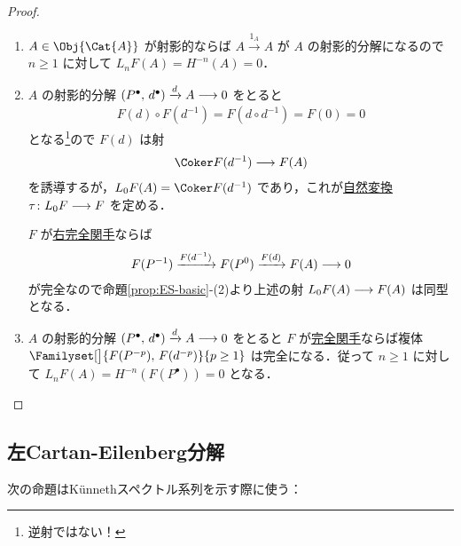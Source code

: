\documentclass[algtopo_main]{subfiles}
\begin{document}
\begin{proof}
\begin{enumerate}
        \item $A \in \Obj{\Cat{A}}$ が射影的ならば $A \xrightarrow{1_A} A$ が $A$ の射影的分解になるので $n\ge 1$ に対して $L_nF(A) = H^{-n}(A) = 0$．
        \item $A$ の射影的分解 $(P^\bullet,\, d^\bullet) \xrightarrow{d} A \longrightarrow 0$ をとると
        \begin{align}
            F(d) \circ F(d^{-1}) = F(d \circ d^{-1}) = F(0) = 0
        \end{align}
        となる\footnote{逆射ではない！}ので $F(d)$ は射
        \begin{align}
            \Coker F(d^{-1}) \lto F(A) 
        \end{align}
        を誘導するが，$L_0F(A) = \Coker F(d^{-1})$ であり，これが\hyperref[def:nat]{自然変換} $\tau \colon L_0F \longrightarrow F$ を定める．

        $F$ が\hyperref[def:Ab-func]{右完全関手}ならば
        \begin{align}
            F(P^{-1}) \xrightarrow{F(d^{-1})} F(P^0) \xrightarrow{F(d)} F(A) \longrightarrow 0
        \end{align}
        が完全なので命題\ref{prop:ES-basic}-(2)より上述の射 $L_0 F(A) \longrightarrow F(A)$ は同型となる．
        \item $A$ の射影的分解 $(P^\bullet,\, d^\bullet) \xrightarrow{d} A \longrightarrow 0$ をとると $F$ が\hyperref[def:Ab-func]{完全関手}ならば複体 $\Familyset[\big]{F(P^{-p}),\, F(d^{-p})}{p\ge 1 }$ は完全になる．従って $n \ge 1$ に対して $L_nF(A) = H^{-n} (F(P^\bullet)) = 0$ となる．
    \end{enumerate}
\end{proof}


\subsection{左Cartan-Eilenberg分解}

次の命題はK\"unnethスペクトル系列を示す際に使う：
\end{document}
